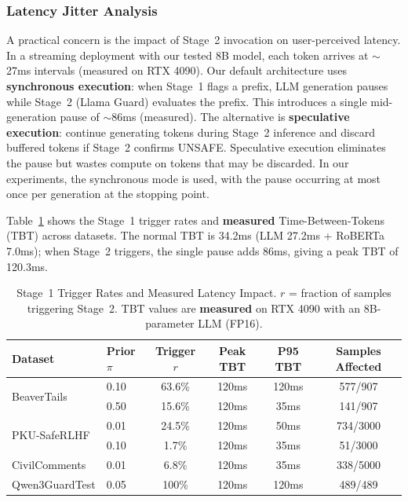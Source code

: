 \documentclass[acmtjournal, acmnowidth]{acmart}
\theoremstyle{definition}
\begin{document}
\subsubsection{Latency Jitter Analysis}
\label{sec:jitter}

A practical concern is the impact of Stage~2 invocation on user-perceived latency. In a streaming deployment with our tested 8B model, each token arrives at ${\sim}$27ms intervals (measured on RTX 4090). Our default architecture uses \textbf{synchronous execution}: when Stage~1 flags a prefix, LLM generation pauses while Stage~2 (Llama Guard) evaluates the prefix. This introduces a single mid-generation pause of ${\sim}$86ms (measured). The alternative is \textbf{speculative execution}: continue generating tokens during Stage~2 inference and discard buffered tokens if Stage~2 confirms UNSAFE. Speculative execution eliminates the pause but wastes compute on tokens that may be discarded. In our experiments, the synchronous mode is used, with the pause occurring at most once per generation at the stopping point.

Table~\ref{tab:trigger_rates} shows the Stage~1 trigger rates and \textbf{measured} Time-Between-Tokens (TBT) across datasets. The normal TBT is 34.2ms (LLM 27.2ms + RoBERTa 7.0ms); when Stage~2 triggers, the single pause adds 86ms, giving a peak TBT of 120.3ms.

\begin{table}[h]
\caption{Stage~1 Trigger Rates and Measured Latency Impact. $r$ = fraction of samples triggering Stage~2. TBT values are \textbf{measured} on RTX 4090 with an 8B-parameter LLM (FP16).}
\label{tab:trigger_rates}
\small
\begin{tabular}{llcccc}
\toprule
Dataset & Prior $\pi$ & Trigger $r$ & Peak TBT & P95 TBT & Samples Affected \\
\midrule
\multirow{2}{*}{BeaverTails}
 & 0.10 & 63.6\% & 120ms & 120ms & 577/907 \\
 & 0.50 & 15.6\% & 120ms & 35ms & 141/907 \\
\midrule
\multirow{2}{*}{PKU-SafeRLHF}
 & 0.01 & 24.5\% & 120ms & 50ms & 734/3000 \\
 & 0.10 & 1.7\% & 120ms & 35ms & 51/3000 \\
\midrule
CivilComments & 0.01 & 6.8\% & 120ms & 35ms & 338/5000 \\
\midrule
Qwen3GuardTest & 0.05 & 100\% & 120ms & 120ms & 489/489 \\
\bottomrule
\end{tabular}
\end{table}
\end{document}
